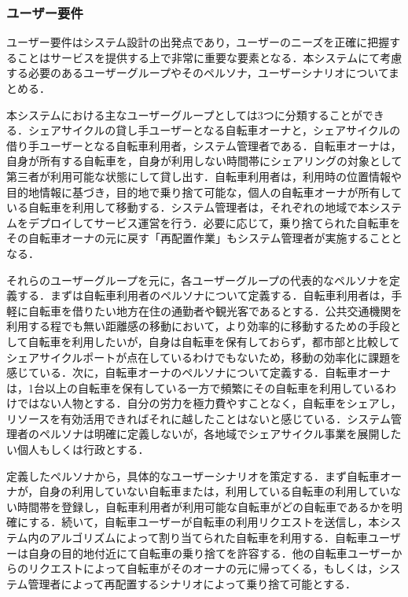       \subsubsection{ユーザー要件}
        \label{sec:ユーザー要件}
          \par ユーザー要件はシステム設計の出発点であり，ユーザーのニーズを正確に把握することはサービスを提供する上で非常に重要な要素となる．本システムにて考慮する必要のあるユーザーグループやそのペルソナ，ユーザーシナリオについてまとめる．
          \par 本システムにおける主なユーザーグループとしては3つに分類することができる．シェアサイクルの貸し手ユーザーとなる自転車オーナと，シェアサイクルの借り手ユーザーとなる自転車利用者，システム管理者である．自転車オーナは，自身が所有する自転車を，自身が利用しない時間帯にシェアリングの対象として第三者が利用可能な状態にして貸し出す．自転車利用者は，利用時の位置情報や目的地情報に基づき，目的地で乗り捨て可能な，個人の自転車オーナが所有している自転車を利用して移動する．システム管理者は，それぞれの地域で本システムをデプロイしてサービス運営を行う．必要に応じて，乗り捨てられた自転車をその自転車オーナの元に戻す「再配置作業」もシステム管理者が実施することとなる．
          \par それらのユーザーグループを元に，各ユーザーグループの代表的なペルソナを定義する．まずは自転車利用者のペルソナについて定義する．自転車利用者は，手軽に自転車を借りたい地方在住の通勤者や観光客であるとする．公共交通機関を利用する程でも無い距離感の移動において，より効率的に移動するための手段として自転車を利用したいが，自身は自転車を保有しておらず，都市部と比較してシェアサイクルポートが点在しているわけでもないため，移動の効率化に課題を感じている．次に，自転車オーナのペルソナについて定義する．自転車オーナは，1台以上の自転車を保有している一方で頻繁にその自転車を利用しているわけではない人物とする．自分の労力を極力費やすことなく，自転車をシェアし，リソースを有効活用できればそれに越したことはないと感じている．システム管理者のペルソナは明確に定義しないが，各地域でシェアサイクル事業を展開したい個人もしくは行政とする．
          \par 定義したペルソナから，具体的なユーザーシナリオを策定する．まず自転車オーナが，自身の利用していない自転車または，利用している自転車の利用していない時間帯を登録し，自転車利用者が利用可能な自転車がどの自転車であるかを明確にする．続いて，自転車ユーザーが自転車の利用リクエストを送信し，本システム内のアルゴリズムによって割り当てられた自転車を利用する．自転車ユーザーは自身の目的地付近にて自転車の乗り捨てを許容する．他の自転車ユーザーからのリクエストによって自転車がそのオーナの元に帰ってくる，もしくは，システム管理者によって再配置するシナリオによって乗り捨て可能とする．
          
